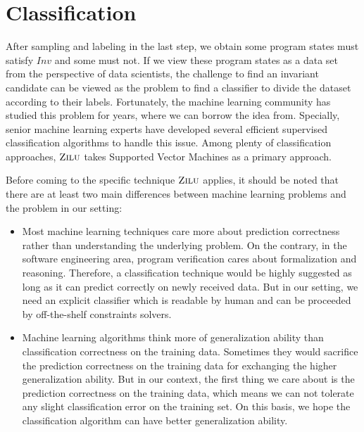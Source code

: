 
\section{Classification} %
\label{sec:classification}

After sampling and labeling in the last step, we obtain some program states must satisfy $Inv$ and some must not. 
If we view these program states as a data set from the perspective of data scientists, 
the challenge to find an invariant candidate can be viewed as the problem to find a classifier to divide the dataset according to their labels.
Fortunately, the machine learning community has studied this problem for years, where we can borrow the idea from.
Specially, senior machine learning experts have developed several efficient supervised classification algorithms to handle this issue.
Among plenty of classification approaches, $\textsc{Zilu}$ takes Supported Vector Machines as a primary approach.

Before coming to the specific technique $\textsc{Zilu}$ applies,
it should be noted that there are at least two main differences between machine learning problems and the problem in our setting:
\begin{itemize}
\item Most machine learning techniques care more about prediction correctness rather than understanding the underlying problem.
On the contrary, in the software engineering area, program verification cares about formalization and reasoning.
Therefore, a classification technique would be highly suggested as long as it can predict correctly on newly received data.
But in our setting, we need an explicit classifier which is readable by human and can be proceeded by off-the-shelf constraints solvers.

\item Machine learning algorithms think more of generalization ability than classification correctness on the training data.
Sometimes they would sacrifice the prediction correctness on the training data for exchanging the higher generalization ability.
But in our context, the first thing we care about is the prediction  correctness on the training data,
which means we can not tolerate any slight classification error on the training set.
On this basis, we hope the classification algorithm can have better generalization ability.
\end{itemize} 


